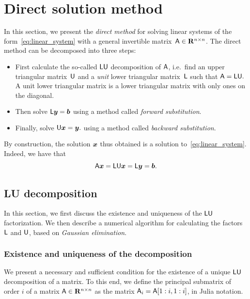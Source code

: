 \section{Direct solution method}%
\label{sec:direct_solution_method}
In this section,
we present the \emph{direct method} for solving linear systems of the form~\eqref{eq:linear_system}
with a general invertible matrix~$\mathsf A \in \mathbf R^{n \times n}$.
The direct method can be decomposed into three steps:
\begin{itemize}
    \item
        First calculate the so-called $\mathsf L \mathsf U$ decomposition of $\mathsf A$,
        i.e.\ find an upper triangular matrix~$\mathsf U$ and a \emph{unit} lower triangular matrix~$\mathsf L$ such that
        \(
            \mathsf A = \mathsf L \mathsf U.
        \)
        A unit lower triangular matrix is a lower triangular matrix with only ones on the diagonal.

    \item
        Then solve
        \(
            \mathsf L \mathbf{\boldsymbol{y}} = \mathbf{\boldsymbol{b}}
        \)
         using a method called \emph{forward substitution}.

    \item
        Finally, solve
        \(
            \mathsf U \mathbf{\boldsymbol{x}} = \mathbf{\boldsymbol{y}}.
        \)
         using a method called \emph{backward substitution}.
\end{itemize}
By construction, the solution $\mathbf{\boldsymbol{x}}$ thus obtained is a solution to~\eqref{eq:linear_system}.
Indeed, we have that
\[
    \mathsf A \mathbf{\boldsymbol{x}} = \mathsf L \mathsf U \mathbf{\boldsymbol{x}} = \mathsf L \mathbf{\boldsymbol{y}} = \mathbf{\boldsymbol{b}}.
\]

\subsection{LU decomposition}%
\label{sub:lu_decomposition}

In this section,
we first discuss the existence and uniqueness of the $\mathsf L \mathsf U$ factorization.
We then describe a numerical algorithm for calculating the factors $\mathsf L$ and $\mathsf U$,
based on \emph{Gaussian elimination}.

\subsubsection*{Existence and uniqueness of the decomposition}%
We present a necessary and sufficient condition for the existence of a unique $\mathsf L \mathsf U$ decomposition of a matrix.
To this end, we define the principal submatrix of order $i$ of a matrix $\mathsf A \in \mathbf R^{n \times n}$
as the matrix $\mathsf A_i = \mathsf A[1:i, 1:i]$, in Julia notation.

